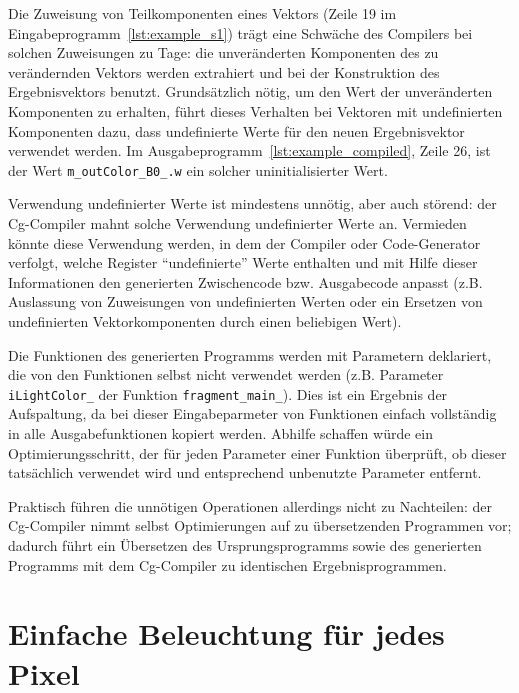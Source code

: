 \documentclass[twoside,a4paper,fleqn,12pt]{book}
\begin{document}
Die Zuweisung von Teilkomponenten eines Vektors (Zeile 19 im Eingabeprogramm~\ref{lst:example_s1}) trägt eine Schwäche des Compilers 
bei solchen Zuweisungen zu Tage: die unveränderten Komponenten des zu verändernden Vektors werden extrahiert
und bei der Konstruktion des Ergebnisvektors benutzt. Grundsätzlich nötig, um den Wert der unveränderten Komponenten
zu erhalten, führt dieses Verhalten bei Vektoren mit undefinierten Komponenten dazu, dass undefinierte Werte für den neuen
Ergebnisvektor verwendet werden. Im Ausgabeprogramm~\ref{lst:example_compiled}, Zeile 26, ist der Wert
\verb+m_outColor_B0_.w+ ein solcher uninitialisierter Wert.

Verwendung undefinierter Werte ist mindestens unnötig, aber auch störend: der Cg-Compiler mahnt solche Verwendung
undefinierter Werte an.
Vermieden könnte diese Verwendung werden, in dem der Compiler oder Code-Generator verfolgt, welche
Register "`undefinierte"' Werte enthalten und mit Hilfe dieser Informationen den generierten Zwischencode bzw. Ausgabecode anpasst (z.B. Auslassung von Zuweisungen
von undefinierten Werten oder ein Ersetzen von undefinierten Vektorkomponenten durch einen beliebigen Wert).

Die Funktionen des generierten Programms werden mit Parametern deklariert, die von den Funktionen selbst nicht verwendet
werden (z.B. Parameter \verb+iLightColor_+ der Funktion \verb+fragment_main_+). Dies ist ein Ergebnis der Aufspaltung, da bei
dieser Eingabeparmeter von Funktionen einfach vollständig in alle Ausgabefunktionen kopiert werden. Abhilfe schaffen würde ein
Optimierungsschritt, der für jeden Parameter einer Funktion überprüft, ob dieser tatsächlich verwendet wird und entsprechend
unbenutzte Parameter entfernt.

Praktisch führen die unnötigen Operationen allerdings nicht zu Nachteilen: der Cg-Compiler nimmt selbst Optimierungen
auf zu übersetzenden Programmen vor; dadurch führt ein Übersetzen des Ursprungsprogramms
sowie des generierten Programms mit dem Cg-Compiler zu identischen Ergebnisprogrammen.


\section{Einfache Beleuchtung für jedes Pixel}
\end{document}
